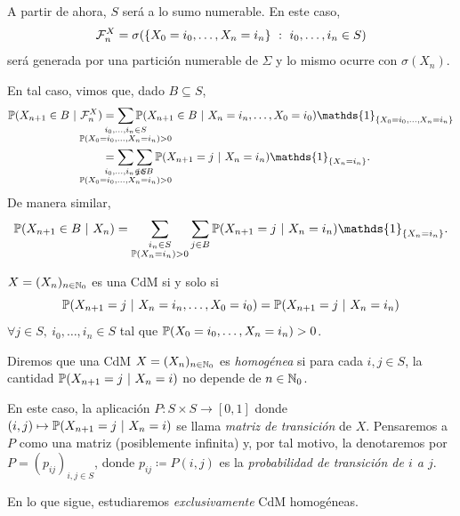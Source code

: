 
\begin{aclaracion}
	A partir de ahora, $S$ será a lo sumo numerable. En este caso,
	\[ \mathcal{F}_{n}^{X} = \sigma(\{X_{0} = i_{0}, \dots, X_{n} = i_{n}\} \ : \ i_{0}, \dots, i_{n} \in S) \]
	será generada por una partición numerable de $\Sigma$ y lo mismo ocurre con $\sigma(X_{n})$. \par 
	En tal caso, vimos que, dado $B \subseteq S$,
	\begin{align*} 
		\mbb{P}(X_{n+1} \in B \ | \ \mcal{F}_{n}^{X}) &= \sum_{\mathclap{\substack{i_{0},\dots,i_{n} \in S \\ \mbb{P}(X_{0}=i_{0},\dots,X_{n}=i_{n}) > 0}}} \mbb{P}(X_{n+1} \in B \ | \ X_{n} = i_{n},\dots,X_{0} = i_{0}) \mathds{1}_{\{X_{0}=i_{0},\dots,X_{n}=i_{n}\}} \\
		&= \sum_{\mathclap{\substack{i_{0},\dots,i_{n} \in S \\ \mbb{P}(X_{0}=i_{0},\dots,X_{n}=i_{n}) > 0}}} \sum_{j \in B} \mbb{P}(X_{n+1} = j \ | \ X_{n} = i_{n}) \mathds{1}_{\{X_{n} = i_{n}\}}
	.\end{align*}
	De manera similar,
	\[ \mbb{P}(X_{n+1} \in B \ | \ X_{n}) = \sum_{\substack{i_{n} \in S \\ \mbb{P}(X_{n} = i_{n}) > 0}} \sum_{j \in B} \mbb{P}(X_{n+1} = j \ | \ X_{n} = i_{n}) \mathds{1}_{\{X_{n} = i_{n}\}}. \]
\end{aclaracion}

\begin{theorem}
	$X = (X_{n})_{n \in \mathbb{N}_{0}}$ es una CdM si y solo si
	\[ \mbb{P}(X_{n+1} = j \ | \ X_{n} = i_{n},\dots,X_{0} = i_{0}) = \mbb{P}(X_{n+1} = j \ | \ X_{n} = i_{n}) \]
	$\forall j \in S,\ i_{0},\dots,i_{n} \in S$ tal que $\mathbb{P}(X_{0}=i_{0}, \dots, X_{n}=i_{n}) > 0$.
\end{theorem}

\begin{definition}
	Diremos que una CdM $X = (X_{n})_{n \in \mathbb{N}_{0}}$ es \textit{homogénea} si para cada $i,j \in S$, la cantidad $\mathbb{P}(X_{n+1} = j \ | \ X_{n} = i)$ no depende de $n \in \mathbb{N}_{0}$. \par
	En este caso, la aplicación $P \colon S \times S \to [0,1]$ donde $(i,j) \mapsto \mbb{P}(X_{n+1} = j \ | \ X_{n} = i)$ se llama \textit{matriz de transición} de $X$. Pensaremos a $P$ como una matriz (posiblemente infinita) y, por tal motivo, la denotaremos por $P = (p_{ij})_{i,j \in S}$, donde $p_{ij} \coloneq P(i,j)$ es la \textit{probabilidad de transición de $i$ a $j$}.
\end{definition}
\medskip
En lo que sigue, estudiaremos \textit{exclusivamente} CdM homogéneas.

